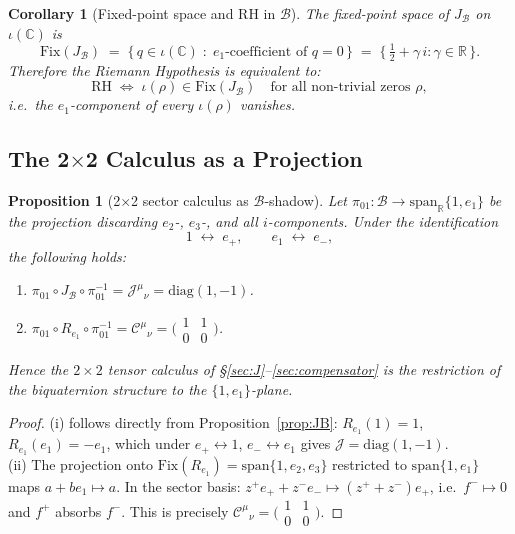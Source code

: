 \documentclass[12pt,a4paper]{article}
\newtheorem{proposition}[theorem]{Proposition}
\newtheorem{corollary}[theorem]{Corollary}
\theoremstyle{remark}
\begin{document}
\begin{corollary}[Fixed-point space and RH in $\mathcal{B}$]
\label{cor:RH_quaternion}
The fixed-point space of $J_{\mathcal{B}}$ on $\iota(\mathbb{C})$ is
\[
  \mathrm{Fix}(J_{\mathcal{B}})
  \;=\;
  \bigl\{\,q\in\iota(\mathbb{C})\;:\;e_1\text{-coefficient of }q=0\,\bigr\}
  \;=\;
  \bigl\{\,\tfrac{1}{2} + \gamma\,i : \gamma\in\mathbb{R}\,\bigr\}.
\]
Therefore the Riemann Hypothesis is equivalent to:
\[
  \mathrm{RH}
  \;\Longleftrightarrow\;
  \iota(\rho)\in\mathrm{Fix}(J_{\mathcal{B}})
  \quad\text{for all non-trivial zeros }\rho,
\]
i.e.\ the $e_1$-component of every $\iota(\rho)$ vanishes.
\end{corollary}

\subsection*{The 2$\times$2 Calculus as a Projection}

\begin{proposition}[2$\times$2 sector calculus as $\mathcal{B}$-shadow]
\label{prop:shadow}
Let $\pi_{01}:\mathcal{B}\to\mathrm{span}_{\mathbb{R}}\{1,e_1\}$
be the projection discarding $e_2$-, $e_3$-, and all $i$-components.
Under the identification
\[
  1\;\longleftrightarrow\; e_+,
  \qquad
  e_1\;\longleftrightarrow\; e_-,
\]
the following holds:
\begin{enumerate}[label=(\roman*),leftmargin=*]
\item $\pi_{01}\circ J_{\mathcal{B}}\circ\pi_{01}^{-1}
      = \mathcal{J}^{\mu}{}_\nu = \mathrm{diag}(1,-1)$.
\item $\pi_{01}\circ R_{e_1}\circ\pi_{01}^{-1}
      = \mathcal{C}^{\mu}{}_\nu = \bigl(\begin{smallmatrix}1&1\\0&0\end{smallmatrix}\bigr)$.
\end{enumerate}
Hence the $2\times2$ tensor calculus of \S\ref{sec:J}--\ref{sec:compensator}
is the restriction of the biquaternion structure to the $\{1,e_1\}$-plane.
\end{proposition}
\begin{proof}
(i) follows directly from Proposition~\ref{prop:JB}: $R_{e_1}(1)=1$,
$R_{e_1}(e_1)=-e_1$, which under $e_+\leftrightarrow1$,
$e_-\leftrightarrow e_1$ gives $\mathcal{J}=\mathrm{diag}(1,-1)$.\\
(ii) The projection onto $\mathrm{Fix}(R_{e_1})=\mathrm{span}\{1,e_2,e_3\}$
restricted to $\mathrm{span}\{1,e_1\}$ maps $a+be_1\mapsto a$.
In the sector basis: $z^+e_++z^-e_-\mapsto(z^++z^-)e_+$,
i.e.\ $f^-\mapsto0$ and $f^+$ absorbs $f^-$.
This is precisely $\mathcal{C}^{\mu}{}_\nu=\bigl(\begin{smallmatrix}1&1\\0&0\end{smallmatrix}\bigr)$.
\end{proof}
\end{document}
